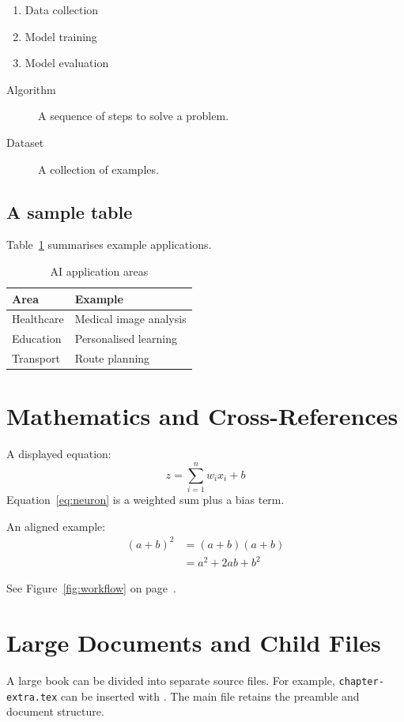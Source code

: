 \documentclass[12pt,a4paper,oneside]{book}
\begin{document}
\begin{enumerate}[label=\Roman*.]
  \item Data collection
  \item Model training
  \item Model evaluation
\end{enumerate}

\begin{description}
  \item[Algorithm] A sequence of steps to solve a problem.
  \item[Dataset] A collection of examples.
\end{description}

\section{A sample table}
Table~\ref{tab:areas} summarises example applications.
\begin{table}[htbp]
\centering
\caption{AI application areas}\label{tab:areas}
\begin{tabular}{|l|l|}
\hline
\textbf{Area} & \textbf{Example}\\ \hline
Healthcare & Medical image analysis\\ \hline
Education & Personalised learning\\ \hline
Transport & Route planning\\ \hline
\end{tabular}
\end{table}

\chapter{Mathematics and Cross-References}
A displayed equation:
\begin{equation}\label{eq:neuron}
z=\sum_{i=1}^{n}w_i x_i+b
\end{equation}
Equation~\eqref{eq:neuron} is a weighted sum plus a bias term.

An aligned example:
\begin{align}
(a+b)^2 &= (a+b)(a+b)\\
        &= a^2+2ab+b^2
\end{align}

See Figure~\ref{fig:workflow} on page~\pageref{fig:workflow}.

\chapter{Large Documents and Child Files}
A large book can be divided into separate source files. For example,
\texttt{chapter-extra.tex} can be inserted with
\verb||. The main file retains the preamble and
document structure.
\end{document}
